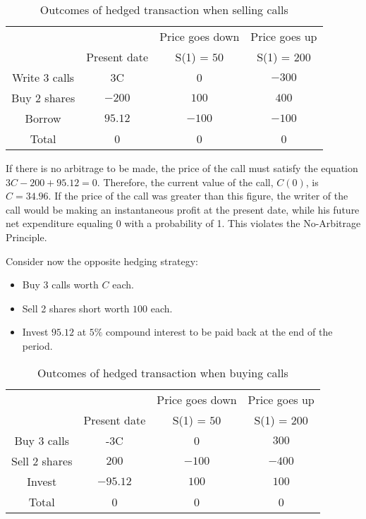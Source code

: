 \documentclass[letterpaper,12pt]{article}
\theoremstyle{plain}
\numberwithin{equation}{section}
\begin{document}
\begin{table}[ht]
\caption{Outcomes of hedged transaction when selling calls} %
\centering %
\begin{tabular}{c c c c} %
\hline\hline %
 &  & Price goes down & Price goes up\\ 
 & Present date & S(1) = $50$ & S(1) = $200$ \\ [0.5ex] %
\hline %
Write 3 calls & 3C & 0 & $-300$ \\ %
Buy 2 shares & $-200$ & $100$ & $400$ \\
Borrow &  $95.12$ & $-100$ & $-100$ \\
Total & 0 & 0 & 0 \\ [1ex] %
\hline %
\end{tabular}
\label{table:nonlin} %
\end{table}

If there is no arbitrage to be made, the price of the call must satisfy the equation $3C - 200 + 95.12 = 0$. Therefore, the current value of the call, $C(0)$, is $C = 34.96$. If the price of the call was greater than this figure, the writer of the call would be making an instantaneous profit at the present date, while his future net expenditure equaling 0 with a probability of 1. This violates the No-Arbitrage Principle. 

Consider now the opposite hedging strategy:
\begin{itemize}
	\item Buy 3 calls worth $C$ each.
	\item Sell 2 shares short worth $100$ each.
	\item Invest $95.12$ at $5\%$ compound interest to be paid back at the end of the period.
\end{itemize}

\begin{table}[ht]
\caption{Outcomes of hedged transaction when buying calls} %
\centering %
\begin{tabular}{c c c c} %
\hline\hline %
 &  & Price goes down & Price goes up\\ 
 & Present date & S(1) = $50$ & S(1) = $200$ \\ [0.5ex] %
\hline %
Buy 3 calls & -3C & 0 & $300$ \\ %
Sell 2 shares & $200$ & $-100$ & $-400$ \\
Invest &  $-95.12$ & $100$ & $100$ \\
Total & 0 & 0 & 0 \\ [1ex] %
\hline %
\end{tabular}
\label{table:nonlin} %
\end{table}
\end{document}
